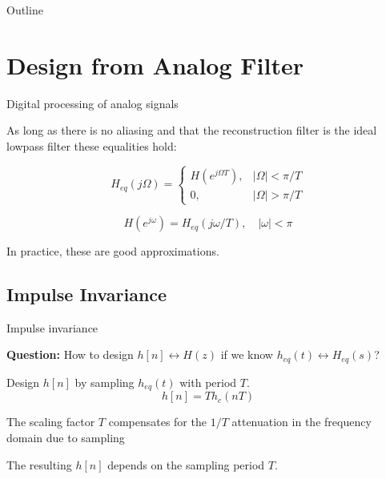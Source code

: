 \documentclass[10pt]{beamer}
\begin{document}
%
\begin{frame}{Outline}
	\tableofcontents
\end{frame}

\section{Design from Analog Filter}
\begin{frame}{Digital processing of analog signals}
\begin{center}
	\def\Heff{1}
	\resizebox{\linewidth}{!}{}
\end{center}

As long as there is no aliasing and that the reconstruction filter is the ideal lowpass filter these equalities hold:

\begin{equation}
H_{eq}(j\Omega) = \begin{cases}
H(e^{j\Omega T}), & |\Omega| < \pi/T \\
0, & |\Omega| > \pi/T
\end{cases} \tag{from DSP to analog}
\end{equation}

\begin{equation}
H(e^{j\omega}) = H_{eq}(j\omega/T), \quad|\omega| < \pi  \tag{from analog to DSP}
\end{equation}

In practice, these are good approximations.
\end{frame}

\subsection{Impulse Invariance}
\begin{frame}{Impulse invariance}

\textbf{Question:} How to design $h[n] \longleftrightarrow H(z)$ if we know $h_{eq}(t) \longleftrightarrow H_{eq}(s)$?

\begin{center}
	\def\Heff{1}
	\resizebox{\linewidth}{!}{}
\end{center}

Design $h[n]$ by sampling $h_{eq}(t)$ with period $T$.
\begin{equation}
	h[n] = Th_c(nT) \tag{impulse invariance}
\end{equation}

The scaling factor $T$ compensates for the $1/T$ attenuation in the frequency domain due to sampling

The resulting $h[n]$ depends on the sampling period $T$.

\end{frame}
\end{document}
